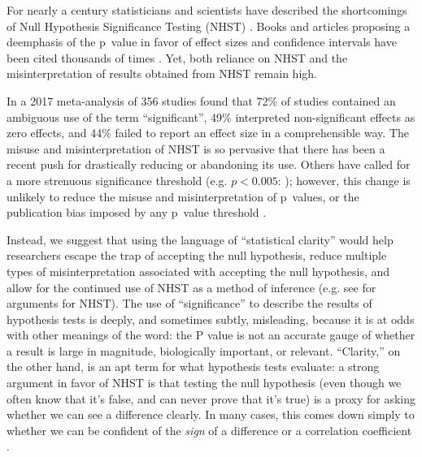 For nearly a century statisticians and scientists have described the shortcomings of Null Hypothesis Significance Testing (NHST) \citep[see][]{Cohen1994}.
Books and articles proposing a deemphasis of the p~value in favor of effect sizes and confidence intervals have been cited thousands of times \citep{Cohen1994, Goodman1999, Wilkinson1999, ZiliakandMcCloskey2008, WassersteinandLazar2016}.
Yet, both reliance on NHST and the misinterpretation of results obtained from NHST remain high.

In a 2017 meta-analysis of 356 studies \citet{Bernardietal.2017} found that 72\% of studies contained an ambiguous use of the term ``significant'', 
49\% interpreted non-significant effects as zero effects, and 44\% failed to report an effect size in a comprehensible 
way.
The misuse and misinterpretation of NHST is so pervasive that there has been a recent push for drastically reducing 
\citep{SzucsandIoannidis2017} or abandoning \citep{McShaneetal.2017} its use.
Others have called for a more
strenuous significance threshold (e.g.
$p < 0.005$: \citealt{Benjaminetal.2018}); however, this change is unlikely to reduce
the misuse and misinterpretation of p~values, or the publication bias imposed by any p~value threshold \citep{Ridleyetal.2007}.

Instead, we suggest that using the language of ``statistical clarity'' would help researchers escape the trap of accepting 
the null hypothesis, reduce multiple types of misinterpretation associated with accepting the null hypothesis, and allow for
the continued use of NHST as a method of inference (e.g.
see \citealt{Abelson1997} for arguments for NHST).
The use of ``significance'' to describe the results of hypothesis tests is deeply, and sometimes subtly, misleading, because it is at odds with other meanings of the word: the P value is not an accurate gauge of whether a result is large in magnitude, biologically important, or relevant.
``Clarity,'' on the other hand, is an apt term for what hypothesis tests evaluate: a strong argument in favor of NHST is that testing the null hypothesis (even though we often know that it's false, and can never prove that it's true) is a proxy for asking whether we can see a difference clearly. In many cases, this comes down simply to whether we can be confident of the \emph{sign} of a difference or a correlation coefficient \cite{robinson2001past}.

